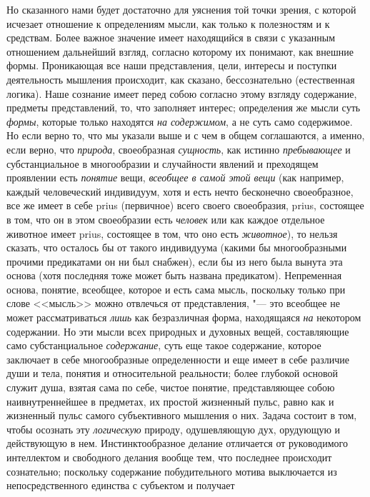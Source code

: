 Но сказанного нами будет достаточно для уяснения той точки зрения, с которой
исчезает отношение к определениям мысли, как только к полезностям и к
средствам. Более важное значение имеет находящийся в связи с указанным
отношением дальнейший взгляд, согласно которому их понимают, как внешние
формы. Проникающая все наши представления, цели, интересы и поступки
деятельность мышления происходит, как сказано, бессознательно (естественная
логика). Наше сознание имеет перед собою согласно этому взгляду содержание,
предметы представлений, то, что заполняет интерес; определения же мысли
суть {\em формы}, которые только находятся
{\em на содержимом}, а не суть само содержимое. Но если
верно то, что мы указали выше и с чем в общем соглашаются, а именно, если
верно, что {\em природа}, своеобразная {\em сущность}, как истинно
{\em пребывающее} и субстанциальное в многообразии и
случайности явлений и преходящем проявлении есть
{\em понятие} вещи, {\em всеобщее в самой этой вещи} (как например, каждый
человеческий индивидуум, хотя и есть нечто бесконечно своеобразное, все же
имеет в себе prius (первичное) всего своего своеобразия, prius, состоящее в
том, что он в этом своеобразии есть {\em человек} или
как каждое отдельное животное имеет prius, состоящее в том, что оно есть
{\em животное}), то нельзя сказать, что осталось бы от
такого индивидуума (какими бы многообразными прочими предикатами он ни был
снабжен), если бы из него была вынута эта основа (хотя последняя тоже может
быть названа предикатом). Непременная основа, понятие, всеобщее, которое и
есть сама мысль, поскольку только при слове <<мысль>> можно отвлечься от
представления, "--- это всеобщее не может рассматриваться
{\em лишь} как безразличная форма, находящаяся
{\em на} некотором содержании. Но эти мысли всех
природных и духовных вещей, составляющие само субстанциальное
{\em содержание}, суть еще такое содержание, которое
заключает в себе многообразные определенности и еще имеет в себе различие
души и тела, понятия и относительной реальности; более глубокой основой
служит душа, взятая сама по себе, чистое понятие, представляющее собою
наивнутреннейшее в предметах, их простой жизненный пульс, равно как и
жизненный пульс самого субъективного мышления о них. Задача состоит в том,
чтобы осознать эту {\em логическую} природу,
одушевляющую дух, орудующую и действующую в нем. Инстинктообразное делание
отличается от руководимого интеллектом и свободного делания вообще тем, что
последнее происходит сознательно; поскольку содержание побудительного
мотива выключается из непосредственного единства с субъектом и получает
